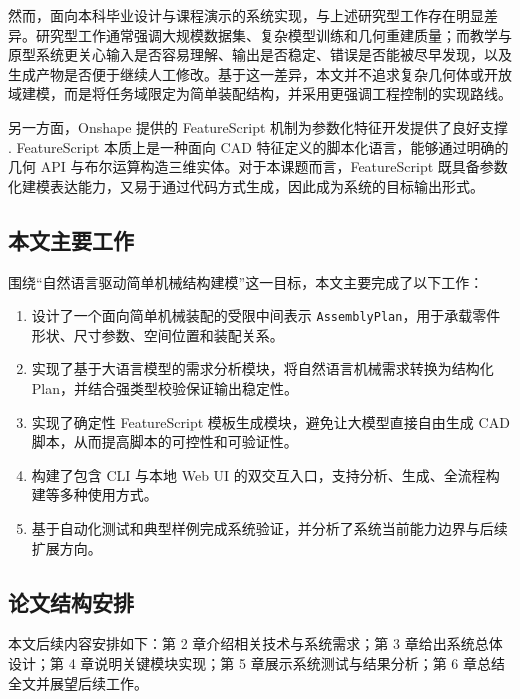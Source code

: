 然而，面向本科毕业设计与课程演示的系统实现，与上述研究型工作存在明显差异。研究型工作通常强调大规模数据集、复杂模型训练和几何重建质量；而教学与原型系统更关心输入是否容易理解、输出是否稳定、错误是否能被尽早发现，以及生成产物是否便于继续人工修改。基于这一差异，本文并不追求复杂几何体或开放域建模，而是将任务域限定为简单装配结构，并采用更强调工程控制的实现路线。

另一方面，Onshape 提供的 FeatureScript 机制为参数化特征开发提供了良好支撑 \cite{onshape_fsdoc,onshape_featurescript}. FeatureScript 本质上是一种面向 CAD 特征定义的脚本化语言，能够通过明确的几何 API 与布尔运算构造三维实体。对于本课题而言，FeatureScript 既具备参数化建模表达能力，又易于通过代码方式生成，因此成为系统的目标输出形式。

\subsection{本文主要工作}

围绕“自然语言驱动简单机械结构建模”这一目标，本文主要完成了以下工作：
\begin{enumerate}[leftmargin=2em]
  \item 设计了一个面向简单机械装配的受限中间表示 \texttt{AssemblyPlan}，用于承载零件形状、尺寸参数、空间位置和装配关系。
  \item 实现了基于大语言模型的需求分析模块，将自然语言机械需求转换为结构化 Plan，并结合强类型校验保证输出稳定性。
  \item 实现了确定性 FeatureScript 模板生成模块，避免让大模型直接自由生成 CAD 脚本，从而提高脚本的可控性和可验证性。
  \item 构建了包含 CLI 与本地 Web UI 的双交互入口，支持分析、生成、全流程构建等多种使用方式。
  \item 基于自动化测试和典型样例完成系统验证，并分析了系统当前能力边界与后续扩展方向。
\end{enumerate}

\subsection{论文结构安排}

本文后续内容安排如下：第 2 章介绍相关技术与系统需求；第 3 章给出系统总体设计；第 4 章说明关键模块实现；第 5 章展示系统测试与结果分析；第 6 章总结全文并展望后续工作。
